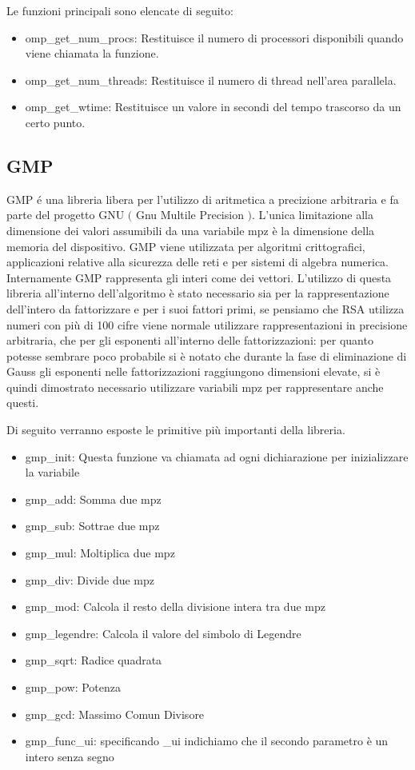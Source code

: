 \begin{flushleft}
Le funzioni principali sono elencate di seguito:
\begin{itemize}
\item omp\_get\_num\_procs: Restituisce il numero di processori disponibili quando viene chiamata la funzione. 
\item omp\_get\_num\_threads: Restituisce il numero di thread nell'area parallela.
\item omp\_get\_wtime: Restituisce un valore in secondi del tempo trascorso da un certo punto. 
\end{itemize}

\subsection{GMP}
\label{subsec:gmp}
GMP \'{e} una libreria libera per l'utilizzo di aritmetica a precizione arbitraria e fa parte
del progetto GNU $($ Gnu Multile Precision $)$.
L'unica limitazione alla dimensione dei valori assumibili da una variabile mpz è la dimensione della
memoria del dispositivo.
GMP viene utilizzata per algoritmi crittografici, applicazioni relative alla sicurezza delle reti
e per sistemi di algebra numerica.
Internamente GMP rappresenta gli interi come dei vettori.
L'utilizzo di questa libreria all'interno dell'algoritmo è stato necessario sia per la rappresentazione
dell'intero da fattorizzare e per i suoi fattori primi, se pensiamo che RSA utilizza numeri con più
di 100 cifre viene normale utilizzare rappresentazioni in precisione arbitraria, che per gli esponenti
all'interno delle fattorizzazioni: per quanto potesse sembrare poco probabile si è notato che durante la fase di eliminazione di Gauss gli esponenti nelle fattorizzazioni raggiungono dimensioni elevate, si è quindi dimostrato necessario utilizzare variabili
mpz per rappresentare anche questi.

Di seguito verranno esposte le primitive più importanti della libreria.
\begin{itemize}
\item gmp\_init: Questa funzione va chiamata ad ogni dichiarazione per inizializzare la variabile
\item gmp\_add: Somma due mpz
\item gmp\_sub: Sottrae due mpz
\item gmp\_mul: Moltiplica due mpz
\item gmp\_div: Divide due mpz
\item gmp\_mod: Calcola il resto della divisione intera tra due mpz
\item gmp\_legendre: Calcola il valore del simbolo di Legendre
\item gmp\_sqrt: Radice quadrata
\item gmp\_pow: Potenza
\item gmp\_gcd: Massimo Comun Divisore
\item gmp\_func\_ui: specificando \_ui indichiamo che il secondo parametro è un intero senza segno
\end{itemize}




\end{flushleft}